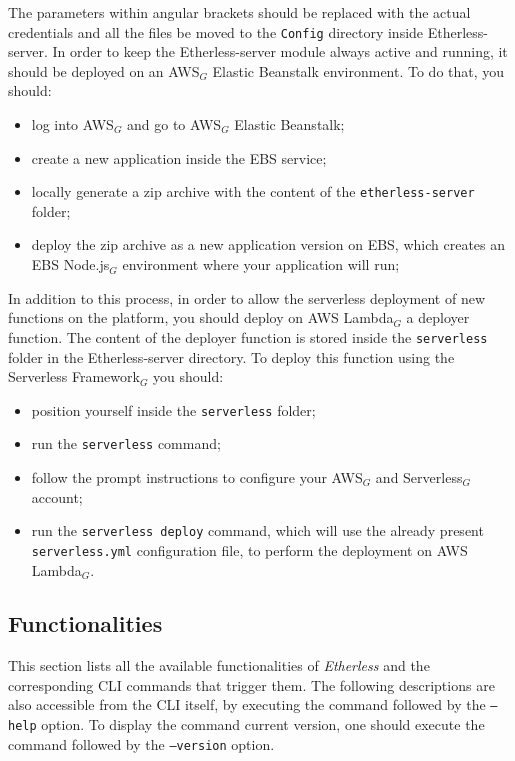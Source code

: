 The parameters within angular brackets should be replaced with the actual credentials and all the files be moved to the \texttt{Config} directory inside Etherless-server.
	In order to keep the Etherless-server module always active and running, it should be deployed on an AWS$_{G}$ Elastic Beanstalk environment. To do that, you should:
	\begin{itemize}
		\item log into AWS$_{G}$ and go to AWS$_{G}$ Elastic Beanstalk;
		\item create a new application inside the EBS service;
		\item locally generate a zip archive with the content of the \texttt{etherless-server} folder;
		\item deploy the zip archive as a new application version on EBS, which creates an EBS Node.js$_{G}$ environment where your application will run;
	\end{itemize}
	In addition to this process, in order to allow the serverless deployment of new functions on the platform, you should deploy on AWS Lambda$_{G}$ a deployer function. The content of the deployer function is stored inside the \texttt{serverless} folder in the Etherless-server directory. To deploy this function using the Serverless Framework$_{G}$ you should:
	\begin{itemize}
		\item position yourself inside the \texttt{serverless} folder;
		\item run the \texttt{serverless} command;
		\item follow the prompt instructions to configure your AWS$_{G}$ and Serverless$_{G}$ account;
		\item run the \texttt{serverless deploy} command, which will use the already present \texttt{serverless.yml} configuration file, to perform the deployment on AWS Lambda$_{G}$.
	\end{itemize}

\subsection{Functionalities}
	This section lists all the available functionalities of \textit{Etherless} and the corresponding CLI commands that trigger them. The following descriptions are also accessible from the CLI itself, by executing the command followed by the \texttt{---help} option. To display the command current version, one should execute the command followed by the \texttt{---version} option.
